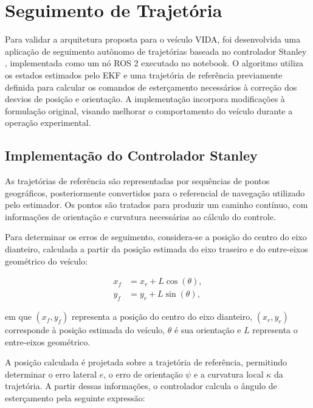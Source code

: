 \section{Seguimento de Trajetória}
\label{sec:seguimento_trajetoria}

Para validar a arquitetura proposta para o veículo VIDA, foi desenvolvida uma aplicação de seguimento autônomo de trajetórias baseada no controlador Stanley \citep{Thrun2006,Hoffmann2007}, implementada como um nó ROS 2 executado no notebook. O algoritmo utiliza os estados estimados pelo EKF e uma trajetória de referência previamente definida para calcular os comandos de esterçamento necessários à correção dos desvios de posição e orientação. A implementação incorpora modificações à formulação original, visando melhorar o comportamento do veículo durante a operação experimental.

\subsection{Implementação do Controlador Stanley}
\label{subsec:implementacao_stanley}

As trajetórias de referência são representadas por sequências de pontos geográficos, posteriormente convertidos para o referencial de navegação utilizado pelo estimador. Os pontos são tratados para produzir um caminho contínuo, com informações de orientação e curvatura necessárias ao cálculo do controle.

Para determinar os erros de seguimento, considera-se a posição do centro do eixo dianteiro, calculada a partir da posição estimada do eixo traseiro e do entre-eixos geométrico do veículo:

\begin{equation}
\begin{aligned}
x_f &= x_r + L\cos(\theta), \\
y_f &= y_r + L\sin(\theta),
\end{aligned}
\label{eq:posicao_eixo_dianteiro}
\end{equation}

em que $(x_f,y_f)$ representa a posição do centro do eixo dianteiro, $(x_r,y_r)$ corresponde à posição estimada do veículo, $\theta$ é sua orientação e $L$ representa o entre-eixos geométrico.

A posição calculada é projetada sobre a trajetória de referência, permitindo determinar o erro lateral $e$, o erro de orientação $\psi$ e a curvatura local $\kappa$ da trajetória. A partir dessas informações, o controlador calcula o ângulo de esterçamento pela seguinte expressão:

